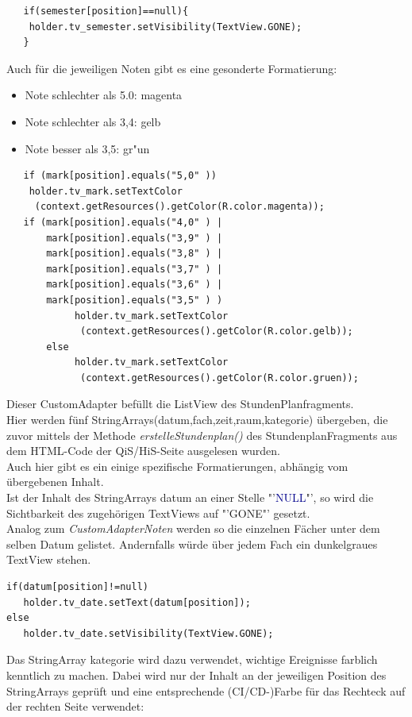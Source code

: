 \begin{description}
\begin{lstlisting}
   if(semester[position]==null){
    holder.tv_semester.setVisibility(TextView.GONE);
   }
\end{lstlisting}
Auch für die jeweiligen Noten gibt es eine gesonderte Formatierung:
\begin{itemize}
\item Note schlechter als 5.0: \textcolor{magentat}{magenta}
\item Note schlechter als 3,4: \textcolor{gelbt}{gelb}
\item Note besser als 3,5: \textcolor{gruent}{gr"un}
\end{itemize}
\begin{lstlisting}
   if (mark[position].equals("5,0" ))
    holder.tv_mark.setTextColor
     (context.getResources().getColor(R.color.magenta));
   if (mark[position].equals("4,0" ) |
       mark[position].equals("3,9" ) |
       mark[position].equals("3,8" ) |
       mark[position].equals("3,7" ) |
       mark[position].equals("3,6" ) |
       mark[position].equals("3,5" ) )
            holder.tv_mark.setTextColor
             (context.getResources().getColor(R.color.gelb));
       else
            holder.tv_mark.setTextColor
             (context.getResources().getColor(R.color.gruen));
\end{lstlisting}

Dieser CustomAdapter befüllt die ListView des StundenPlanfragments.\\
Hier werden fünf StringArrays(\textcolor{lila}{datum},\textcolor{lila}{fach},\textcolor{lila}{zeit},\textcolor{lila}{raum},\textcolor{lila}{kategorie}) übergeben, die zuvor mittels der Methode \textit{erstelleStundenplan()} des StundenplanFragments aus dem HTML-Code der QiS/HiS-Seite ausgelesen wurden.\\
Auch hier gibt es ein einige spezifische Formatierungen, abhängig vom übergebenen Inhalt.\\
Ist der Inhalt des StringArrays \textcolor{lila}{datum} an einer Stelle "'\textcolor{darkblue}{NULL}"', so wird die Sichtbarkeit des zugehörigen TextViews auf  "'\textcolor{lila}{GONE}"' gesetzt.\\
Analog zum \textit{CustomAdapterNoten} werden so die einzelnen Fächer unter dem selben Datum gelistet. Andernfalls würde über jedem Fach ein dunkelgraues TextView stehen.
\begin{lstlisting}
if(datum[position]!=null)
   holder.tv_date.setText(datum[position]);
else
   holder.tv_date.setVisibility(TextView.GONE);
\end{lstlisting}
Das StringArray \textcolor{lila}{kategorie} wird dazu verwendet, wichtige Ereignisse farblich kenntlich zu machen. Dabei wird nur der Inhalt an der jeweiligen Position des StringArrays geprüft und eine entsprechende (CI/CD-)Farbe für das Rechteck auf der rechten Seite verwendet:


\end{description}
